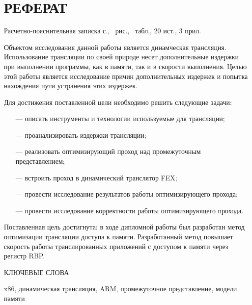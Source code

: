 \section*{РЕФЕРАТ}

Расчетно-пояснительная записка \pageref{LastPage} с., \totalfigures\ рис., \totaltables\ табл., 20 ист., 3 прил.

Объектом исследования данной работы является динамческая трансляция. Использование трансляции по своей природе несет дополнительные издержки при выполнении программы, как в памяти, так и в скорости выполнения. Целью этой работы является исследование причин дополнительных издержек и попытка нахождения пути устранения этих издержек.

Для достижения поставленной цели необходимо решить следующие задачи:

\begin{itemize}[leftmargin=1.6\parindent]
	\item [---] описать инструменты и технологии используемые для трансляции;
	\item [---] проанализировать издержки трансляции;
	\item [---] реализовать оптимизирующий проход над промежуточным представлением;
	\item [---] встроить проход в динамический транслятор FEX;
	\item [---] провести исследование результатов работы оптимизирующего прохода;
	\item [---] провести исследование корректности работы оптимизирующего прохода.
\end{itemize}

Поставленная цель достигнута: в ходе дипломной работы был разработан метод оптимизации трансляции доступа к памяти. Разработанный метод повышает скорость работы транслированных приложений с доступом к памяти через регистр RBP.

КЛЮЧЕВЫЕ СЛОВА

x86, динамическая трансляция, ARM, промежуточное представление, модели памяти

\pagebreak
